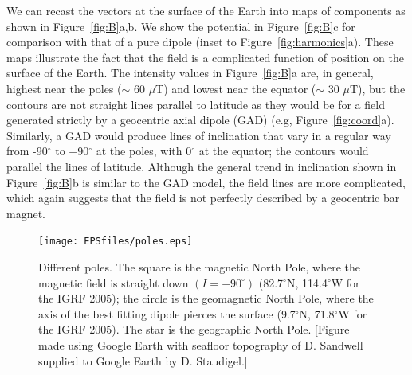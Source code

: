    We can recast the vectors at the surface of the Earth into  maps of components as  shown in 
Figure~\ref{fig:B}a,b.   
We show the potential in Figure~\ref{fig:B}c for comparison with that of  a pure dipole (inset to Figure~\ref{fig:harmonics}a).      These maps illustrate the fact that
the field is a complicated function of position on the surface of the Earth.  
The intensity values in Figure~\ref{fig:B}a are, in
general,  highest near the poles ($\sim$ 60 $\mu$T) and lowest near the equator
($\sim$ 30 $\mu$T), but the contours are not straight lines parallel to latitude
as they would be for a field generated strictly by a 
geocentric axial dipole (GAD) (e.g, Figure~\ref{fig:coord}a).  
 Similarly, a GAD would produce lines of 
inclination that vary in a regular way from -90$^{\circ}$ to +90$^{\circ}$
at the poles, with 0$^{\circ}$ at the equator;  the contours
would parallel the lines of latitude.  Although the general trend in inclination
shown in Figure~\ref{fig:B}b is similar to the GAD model, the field lines are more complicated, which again suggests that the field is not perfectly
described by a geocentric bar magnet. 





\begin{figure}[htb]
\centering  \texttt{[image: EPSfiles/poles.eps]}
\caption{Different poles.  
The square is the magnetic North Pole, where the magnetic field is straight
down $(I = +90^{\circ})$ (82.7$^{\circ}$N, 114.4$^{\circ}$W for  the IGRF 2005); the circle is the geomagnetic North Pole, where the axis of the
best fitting dipole pierces the surface (9.7$^{\circ}$N, 71.8$^{\circ}$W for the  IGRF 2005). 
 The star is the geographic North Pole.  [Figure made using Google Earth with seafloor topography of  D. Sandwell supplied to Google Earth by  D. Staudigel.]}
\label{fig:poles}
\end{figure}




